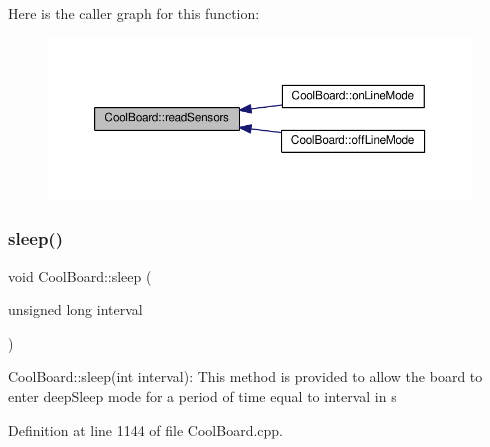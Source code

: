 Here is the caller graph for this function\+:\nopagebreak
\begin{figure}[H]
\begin{center}
\leavevmode
\includegraphics[width=350pt]{d7/df9/class_cool_board_ad03abdce2e65f520bbf2cff0f2d083cf_icgraph}
\end{center}
\end{figure}
\mbox{\label{class_cool_board_a069952cdcb2e7f68518aa429eceadb6e}} 
\subsubsection{\texorpdfstring{sleep()}{sleep()}}
{\footnotesize\ttfamily void Cool\+Board\+::sleep (\begin{DoxyParamCaption}\item[{unsigned long}]{interval }\end{DoxyParamCaption})}

Cool\+Board\+::sleep(int interval)\+: This method is provided to allow the board to enter deep\+Sleep mode for a period of time equal to interval in s 

Definition at line 1144 of file Cool\+Board.\+cpp.


